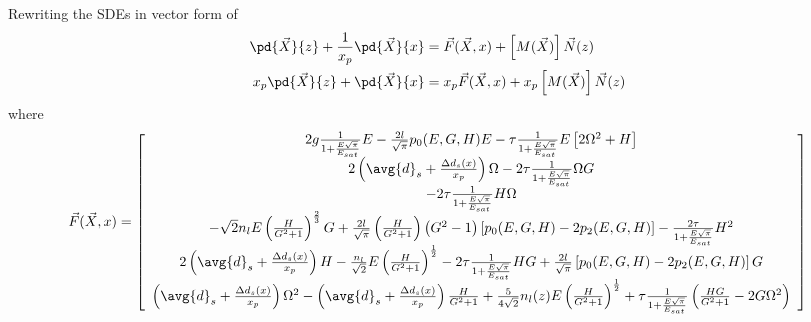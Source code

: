 Rewriting the SDEs in vector form of 
\begin{equation}
\begin{split}
\pd{\vec{X}}{z} + \frac{1}{x_p} \pd{\vec{X}}{x} &= \vec{F}(\vec{X},x) + \left[M(\vec{X})\right]\vec{N}(z)\\
x_p \pd{\vec{X}}{z} + \pd{\vec{X}}{x} &= x_p \vec{F}(\vec{X},x) + x_p \left[M(\vec{X})\right]\vec{N}(z)\\
\end{split}
\end{equation}
where 
\begin{align}
\vec{F}(\vec{X},x)= \left[\begin{array}{c}
2g \frac{1}{1+\frac{E\sqrt{\pi}}{E_{sat}}} E - \frac{2l}{\sqrt{\pi}} p_0(E,G,H) E - \tau \frac{1}{1+\frac{E\sqrt{\pi}}{E_{sat}}} E \left[2\Omega^2 + H\right] \\ 
2\left(\avg{d}_s + \frac{\Delta d_s(x)}{x_p}\right) \Omega - 2 \tau \frac{1}{1+\frac{E\sqrt{\pi}}{E_{sat}}} \Omega G \\
-2\tau \frac{1}{1+\frac{E\sqrt{\pi}}{E_{sat}}} H \Omega\\
-\sqrt{2}n_{l}E \left(\frac{H}{G^2+1}\right)^{\frac{2}{3}} G + \frac{2l}{\sqrt{\pi}} \left(\frac{H}{G^2+1}\right) \left(G^2-1\right)\left[p_0(E,G,H) - 2p_2(E,G,H)\right] - \frac{2\tau}{1+\frac{E \sqrt{\pi}}{E_{sat}}} H^2 \\
2 \left(\avg{d}_s + \frac{\Delta d_s(x)}{x_p}\right) H - \frac{n_{l}}{\sqrt{2}}E \left(\frac{H}{G^2+1}\right)^{\frac{1}{2}} - 2\tau\frac{1}{1+\frac{E \sqrt{\pi}}{E_{sat}}} HG + \frac{2l}{\sqrt{\pi}}\left[p_0(E,G,H) - 2p_2(E,G,H)\right]G \\ 
\left(\avg{d}_s + \frac{\Delta d_s(x)}{x_p}\right) \Omega^2 - \left(\avg{d}_s + \frac{\Delta d_s(x)}{x_p}\right) \frac{H}{G^2+1}  + \frac{5}{4\sqrt{2}}n_{l}(z)E  \left(\frac{H}{G^2+1}\right)^{\frac{1}{2}} + \tau \frac{1}{1+\frac{E\sqrt{\pi}}{E_{sat}}} \left( \frac{HG}{G^2+1} - 2G\Omega^2  \right) \\
\end{array}\right]
 \end{align}

